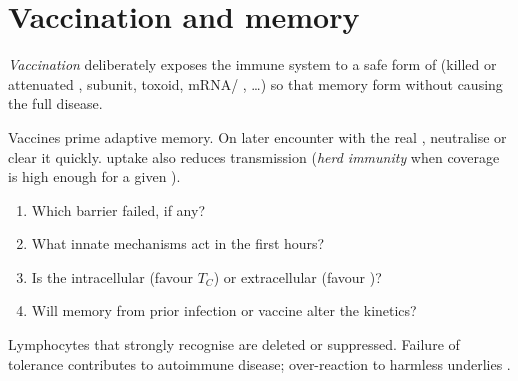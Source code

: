 \section{Vaccination and memory}

\begin{definition}[Vaccination]\label{def:g12:immunity:vaccine}
\emph{Vaccination} deliberately exposes the immune
system to a safe form of  (killed or attenuated ,
subunit, toxoid, mRNA/ , \ldots) so that memory  form
without causing the full disease.
\end{definition}

\begin{proposition}\label{prop:g12:immunity:vaccine}
Vaccines prime adaptive memory. On later encounter with the real
,  neutralise or clear it quickly. 
uptake also reduces transmission (\emph{herd immunity} when coverage is high enough for a given ).
\end{proposition}
\admitted

\begin{method}
\label{met:g12:immunity:reason}
\begin{enumerate}
  \item Which barrier failed, if any?
  \item What innate mechanisms act in the first hours?
  \item Is the  intracellular (favour $T_C$) or extracellular
        (favour )?
  \item Will memory from prior infection or vaccine alter the kinetics?
\end{enumerate}
\end{method}

\begin{remark}\label{rem:g12:immunity:tolerance}
Lymphocytes that strongly recognise  are deleted or
suppressed. Failure of tolerance contributes to autoimmune disease;
over-reaction to harmless  underlies .
\end{remark}

